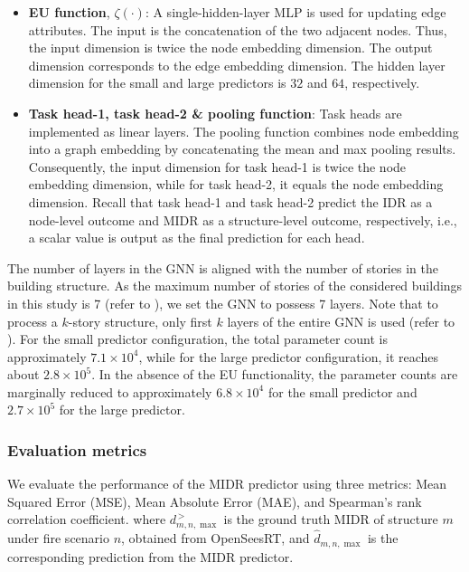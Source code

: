 \begin{itemize}
    \item {\bf{EU function}}, $\zeta\left(\cdot\right)$: A single-hidden-layer MLP is used for updating edge attributes. The input is the concatenation of the two adjacent nodes. Thus, the input dimension is twice the node embedding dimension. The output dimension corresponds to the edge embedding dimension. The hidden layer dimension for the small and large predictors is $32$ and $64$, respectively.
    \item {\bf{Task head-1, task head-2 \& pooling function}}: Task heads are implemented as linear layers. The pooling function combines node embedding into a graph embedding by concatenating the mean and max pooling results. Consequently, the input dimension for task head-1 is twice the node embedding dimension, while for task head-2, it equals the node embedding dimension. Recall that task head-1 and task head-2 predict the IDR as a node-level outcome and MIDR as a structure-level outcome, respectively, i.e., a scalar value is output as the final prediction for each head.
\end{itemize}

The number of layers in the GNN is aligned with the number of stories in the building structure. As the maximum number of stories of the considered buildings in this study is 7 (refer to ), we set the GNN to possess 7 layers. Note that to process a $k$-story structure, only first $k$ layers of the entire GNN is used (refer to ). For the small predictor configuration, the total parameter count is approximately $7.1 \times 10^4$, while for the large predictor configuration, it reaches about $2.8 \times 10^5$. In the absence of the EU functionality, the parameter counts are marginally reduced to approximately $6.8\times 10^4$ for the small predictor and $2.7 \times 10^5$ for the large predictor.

\subsubsection{Evaluation metrics}
We evaluate the performance of the MIDR predictor using three metrics: Mean Squared Error (MSE), Mean Absolute Error (MAE), and Spearman's rank correlation coefficient. 
where $d_{m,n, \max}^{\, \gt}$ is the ground truth MIDR of structure $m$ under fire scenario $n$, obtained from OpenSeesRT, and $\widehat{d}_{m,n, \max}$ is the corresponding prediction from the MIDR predictor.


